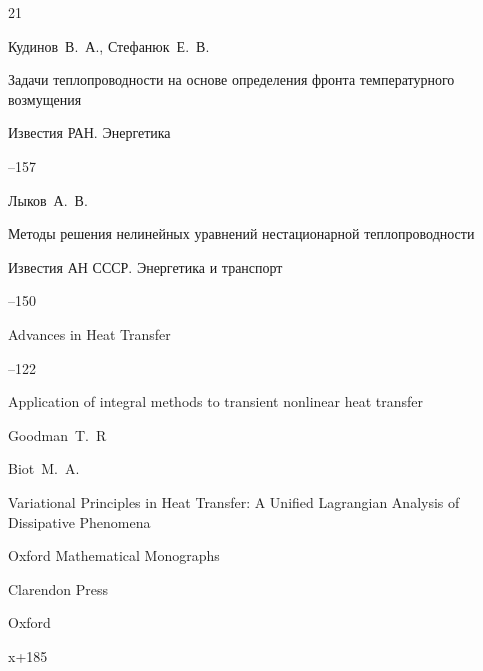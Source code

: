 \begin{thebibliography}{21}






\by Кудинов~В.~А., Стефанюк~Е.~В.

\paper Задачи теплопроводности на основе определения фронта температурного возмущения

\jour Известия РАН. Энергетика



--157





\by Лыков~А.~В.

\paper Методы решения нелинейных уравнений нестационарной теплопроводности

\jour Известия АН СССР. Энергетика и транспорт



--150




\jour Advances in Heat Transfer



–122

\paper Application of integral methods to transient nonlinear heat transfer

\by Goodman~T.~R







\by Biot~M.~A.

\book Variational Principles in Heat Transfer: A Unified Lagrangian Analysis of Dissipative Phenomena

\serial Oxford Mathematical Monographs

\publ Clarendon Press

\publaddr Oxford 


\totalpages x+185






\end{thebibliography}
